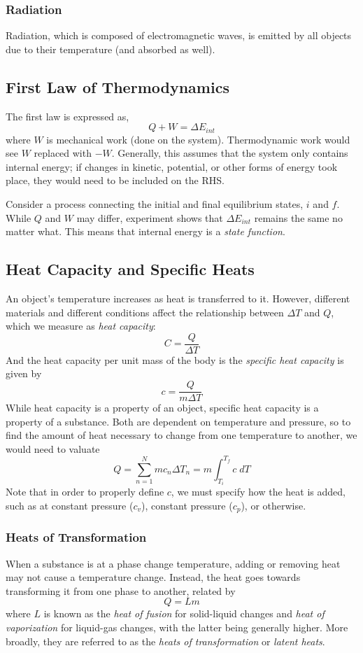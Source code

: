 \documentclass[../PhysicsFormulae.tex]{subfiles}
\begin{document}
\subsubsection{Radiation}
Radiation, which is composed of electromagnetic waves, is emitted by all objects due to their temperature (and absorbed as well). 

\subsection{First Law of Thermodynamics}
The first law is expressed as, 
\[ Q + W = \Delta E_{int} \] 
where $W$ is mechanical work (done on the system). Thermodynamic work would see $W$ replaced with $-W$. Generally, this assumes that the system only contains internal energy; if changes in kinetic, potential, or other forms of energy took place, they would need to be included on the RHS. \bigskip

Consider a process connecting the initial and final equilibrium states, $i$ and $f$. While $Q$ and $W$ may differ, experiment shows that $\Delta E_{int}$ remains the same no matter what. This means that internal energy is a \textit{state function}. 

\subsection{Heat Capacity and Specific Heats}
An object's temperature increases as heat is transferred to it. However, different materials and different conditions affect the relationship between $\Delta T$ and $Q$, which we measure as \textit{heat capacity}:
\[ C = \frac{Q}{\Delta T} \]
And the heat capacity per unit mass of the body is the \textit{specific heat capacity} is given by 
\[ c = \frac{Q}{m \Delta T} \]
While heat capacity is a property of an object, specific heat capacity is a property of a substance. Both are dependent on temperature and pressure, so to find the amount of heat necessary to change from one temperature to another, we would need to valuate
\[ Q = \sum_{n=1}^{N}mc_n \Delta T_n = m \int_{T_i}^{T_f} c \; dT \]
Note that in order to properly define $c$, we must specify how the heat is added, such as at constant pressure ($c_v$), constant pressure ($c_p$), or otherwise.

\subsubsection{Heats of Transformation}
When a substance is at a phase change temperature, adding or removing heat may not cause a temperature change. Instead, the heat goes towards transforming it from one phase to another, related by 
\[ Q = Lm \]
where $L$ is known as the \textit{heat of fusion} for solid-liquid changes and \textit{heat of vaporization} for liquid-gas changes, with the latter being generally higher. More broadly, they are referred to as the \textit{heats of transformation} or \textit{latent heats}.
\end{document}
